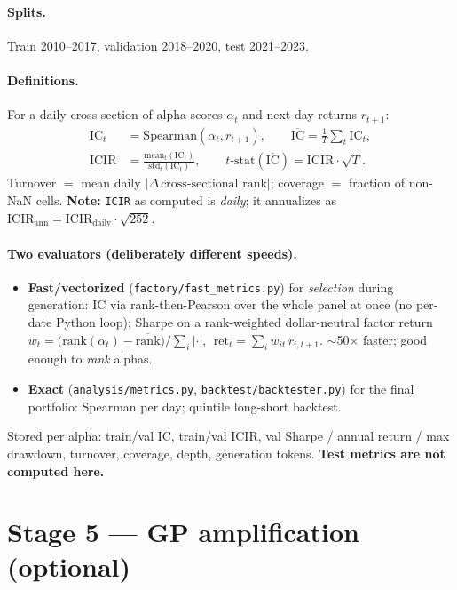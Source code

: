 \documentclass[11pt]{article}
\newcommand{\code}[1]{\texttt{#1}}
\newcommand{\file}[1]{\texttt{#1}}
\begin{document}
\paragraph{Splits.} Train 2010--2017, validation 2018--2020, test 2021--2023.

\paragraph{Definitions.} For a daily cross-section of alpha scores $\alpha_t$ and
next-day returns $r_{t+1}$:
\begin{align*}
\mathrm{IC}_t &= \mathrm{Spearman}(\alpha_t, r_{t+1}), \qquad
\overline{\mathrm{IC}} = \tfrac{1}{T}\textstyle\sum_t \mathrm{IC}_t,\\
\mathrm{ICIR} &= \frac{\mathrm{mean}_t(\mathrm{IC}_t)}{\mathrm{std}_t(\mathrm{IC}_t)},
\qquad t\text{-stat}(\overline{\mathrm{IC}}) = \mathrm{ICIR}\cdot\sqrt{T}.
\end{align*}
Turnover $=$ mean daily $|\Delta\,\text{cross-sectional rank}|$; coverage $=$ fraction
of non-NaN cells. \textbf{Note:} \code{ICIR} as computed is \emph{daily}; it
annualizes as $\mathrm{ICIR}_{\text{ann}} = \mathrm{ICIR}_{\text{daily}}\cdot\sqrt{252}$.

\paragraph{Two evaluators (deliberately different speeds).}
\begin{itemize}[leftmargin=*]
  \item \textbf{Fast/vectorized} (\file{factory/fast\_metrics.py}) for \emph{selection}
  during generation: IC via rank-then-Pearson over the whole panel at once (no
  per-date Python loop); Sharpe on a rank-weighted dollar-neutral factor return
  $w_t = \big(\mathrm{rank}(\alpha_t) - \overline{\mathrm{rank}}\big)\big/\sum_i|\cdot|$,
  $\;\mathrm{ret}_t = \sum_i w_{it}\,r_{i,t+1}$. $\sim$50$\times$ faster; good enough to
  \emph{rank} alphas.
  \item \textbf{Exact} (\file{analysis/metrics.py}, \file{backtest/backtester.py}) for
  the final portfolio: Spearman per day; quintile long-short backtest.
\end{itemize}
Stored per alpha: train/val IC, train/val ICIR, val Sharpe / annual return /
max drawdown, turnover, coverage, depth, generation tokens. \textbf{Test metrics are
not computed here.}

\section{Stage 5 --- GP amplification (optional)}
\end{document}
